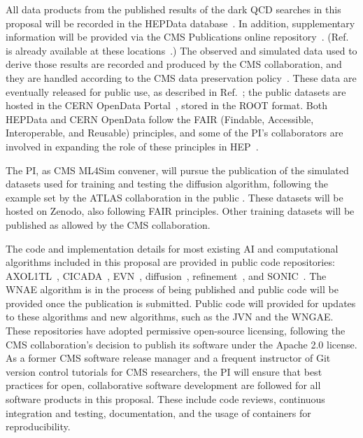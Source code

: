 All data products from the published results of the dark QCD searches in this proposal will be recorded in the HEPData database~\cite{Maguire:2017ypu}.
In addition, supplementary information will be provided via the CMS Publications online repository~\cite{cmspub}.
(Ref.~\cite{CMS:2021dzg} is already available at these locations~\cite{hepdata,EXO-19-020}.)
The observed and simulated data used to derive those results are recorded and produced by the CMS collaboration,
and they are handled according to the CMS data preservation policy~\cite{cmsdata}.
These data are eventually released for public use, as described in Ref.~\cite{cmsdata};
the public datasets are hosted in the CERN OpenData Portal~\cite{opendata}, stored in the ROOT format.
Both HEPData and CERN OpenData follow the FAIR (Findable, Accessible, Interoperable, and Reusable) principles,
and some of the PI's collaborators are involved in expanding the role of these principles in HEP~\cite{FAIR4HEP}.

The PI, as CMS ML4Sim convener, will pursue the publication of the simulated datasets used for training and testing the diffusion algorithm,
following the example set by the ATLAS collaboration in the public \challenge.
These datasets will be hosted on Zenodo, also following FAIR principles.
Other training datasets will be published as allowed by the CMS collaboration.

The code and implementation details for most existing AI and computational algorithms included in this proposal are provided in public code repositories:
AXOL1TL~\cite{AXOL1TL:repo}, CICADA~\cite{CICADA:repo}, EVN~\cite{EVN:repo}, diffusion~\cite{CaloDiffusion:repo}, refinement~\cite{Refinement:repo}, and SONIC~\cite{SONIC:repo}.
The WNAE algorithm is in the process of being published and public code will be provided once the publication is submitted.
Public code will provided for updates to these algorithms and new algorithms, such as the JVN and the WNGAE.
These repositories have adopted permissive open-source licensing, following the CMS collaboration's decision to publish its software under the Apache 2.0 license.
As a former CMS software release manager and a frequent instructor of Git version control tutorials for CMS researchers,
the PI will ensure that best practices for open, collaborative software development are followed for all software products in this proposal.
These include code reviews, continuous integration and testing, documentation, and the usage of containers for reproducibility.
